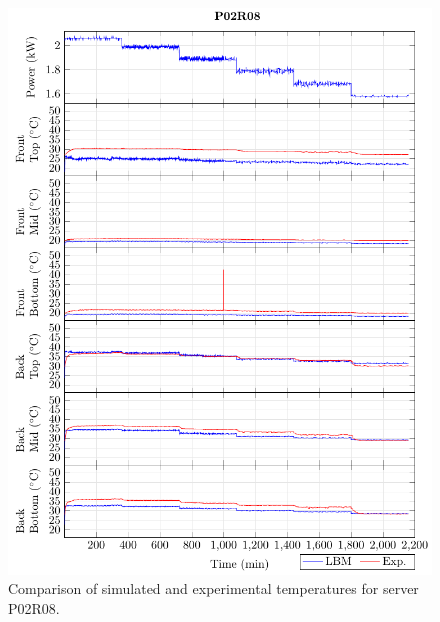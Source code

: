 \documentclass[border=10pt,preview]{standalone}
\begin{document}
\begin{figure}[!htb]
\centering
\includegraphics[width=\linewidth]{Plots/P02R08_T.pdf}
\caption{Comparison of simulated and experimental temperatures for server P02R08.}
\label{fig:P02R08_plot}
\end{figure}

\clearpage
\end{document}
